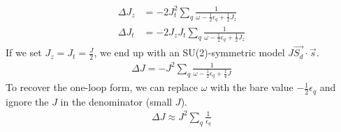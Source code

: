 \documentclass[12pt,twoside]{article}
\numberwithin{equation}{section}
\begin{document}
\begin{equation}\begin{aligned}
	\Delta J_z &= - 2J_t^2 \sum_q \frac{1}{\omega - \frac{1}{2}\epsilon_q+ \frac{1}{2}J_z}\\
	\Delta J_t &= -2J_z J_t \sum_q\frac{1}{\omega - \frac{1}{2}\epsilon_q+ \frac{1}{2}J_z }
\end{aligned}\end{equation}
If we set \(J_z = J_t = \frac{J}{2}\), we end up with an SU(2)-symmetric model \(J \vec{S_d}\cdot\vec{s}\).
\begin{equation}\begin{aligned}
	\label{kondosym}
	\Delta J = - J^2 \sum_q \frac{1}{\omega - \frac{1}{2}\epsilon_q+ \frac{1}{4}J}
\end{aligned}\end{equation}
To recover the one-loop form, we can replace \(\omega\) with the bare value \(-\frac{1}{2}\epsilon_q\) and ignore the \(J\) in the denominator (small \(J\)).
\begin{equation}\begin{aligned}
	\Delta J \approx J^2 \sum_q \frac{1}{\epsilon_q}
\end{aligned}\end{equation}
\end{document}
